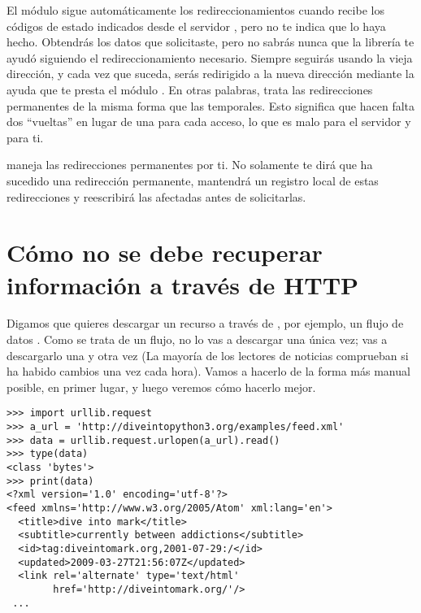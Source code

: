 El módulo  sigue automáticamente los redireccionamientos cuando recibe los códigos de estado indicados desde el servidor , pero no te indica que lo haya hecho. Obtendrás los datos que solicitaste, pero no sabrás nunca que la librería te ayudó siguiendo el redireccionamiento necesario. Siempre seguirás usando la vieja dirección, y cada vez que suceda, serás redirigido a la nueva dirección mediante la ayuda que te presta el módulo . En otras palabras, trata las redirecciones permanentes de la misma forma que las temporales. Esto significa que hacen falta dos ``vueltas'' en lugar de una para cada acceso, lo que es malo para el servidor y para ti.

 maneja las redirecciones permanentes por ti. No solamente te dirá que ha sucedido una redirección permanente, mantendrá un registro local de estas redirecciones y reescribirá las  afectadas antes de solicitarlas.

\section{Cómo no se debe recuperar información a través de HTTP}

Digamos que quieres descargar un recurso a través de , por ejemplo, un flujo de datos . Como se trata de un flujo, no lo vas a descargar una única vez; vas a descargarlo una y otra vez (La mayoría de los lectores de noticias comprueban si ha habido cambios una vez cada hora). Vamos a hacerlo de la forma más manual posible, en primer lugar, y luego veremos cómo hacerlo mejor.

\noindent\begin{minipage}{\textwidth}
\begin{lstlisting}[mathescape=False]
>>> import urllib.request
>>> a_url = 'http://diveintopython3.org/examples/feed.xml'
>>> data = urllib.request.urlopen(a_url).read()
>>> type(data)
<class 'bytes'>
>>> print(data)
<?xml version='1.0' encoding='utf-8'?>
<feed xmlns='http://www.w3.org/2005/Atom' xml:lang='en'>
  <title>dive into mark</title>
  <subtitle>currently between addictions</subtitle>
  <id>tag:diveintomark.org,2001-07-29:/</id>
  <updated>2009-03-27T21:56:07Z</updated>
  <link rel='alternate' type='text/html'
        href='http://diveintomark.org/'/>
 ... 
\end{lstlisting}
\end{minipage}

